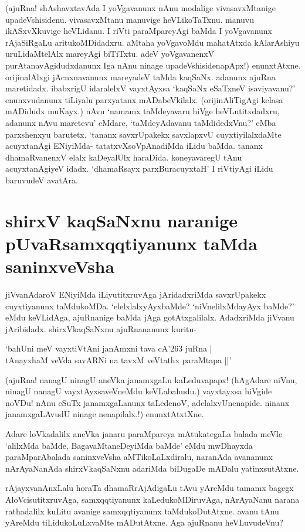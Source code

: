 (ajuRna! shAshavxtavAda I yoVgavanunx nAnu modalige vivasavxMtanige upadeVshisidenu. vivasavxMtanu manuvige heVLikoTaTxnu. manuvu ikASxvXkuvige heVLidanu. I riVti paraMpareyAgi baMda I yoVgavanunx rAjaSiRgaLu aritukoMDidadxru. aMtaha yoVgavoMdu mahatAtxda kAlarAshiyu uruLidaMtelAlx mareyAgi biTiTxtu. adeV yoVgavanenxV purAtanavAgidudxdanunx Iga nAnu ninage upadeVshisidenapApx!) enunxtAtxne. orijinalAlxgi jAcnxnavanunx mareyadeV taMda kaqSaNx. adanunx ajuRna maretidadx. ibabxrigU idaralelxV vayxtAyxsa `kaqSaNx eSaTxneV isaviyavanu?' enunxvudanunx tiLiyalu parxyatanx mADabeVkilalx. (orijinAliTigAgi kelasa mADidudx muKayx.) nAvu `namamx taMdeyavaru hiVge heVLutitxdadxru, adanunx nAvu maretevu' eMdare, `taMdeyAdavanu taMdidedxVnu?' eMba parxshenxyu barutetx. `tananx savxrUpakekx savxlapxvU cuyxtiyilalxdaMte acuyxtanAgi ENiyiMda- tatatxvXsoVpAnadiMda iLidu baMda. tananx dhamaRvanenxV elalx kaDeyalUlx haraDida. koneyavaregU tAnu acuyxtanAgiyeV idadx. `dhamaRsayx parxBuracuyxtaH'\label{90a} I riVtiyAgi iLidu baruvudeV avatAra. 

\section*{shirxV kaqSaNxnu naranige pUvaRsamxqqtiyanunx taMda saninxveVsha}

jiVvanAdaroV ENiyiMda iLiyutitxruvAga jAridadxriMda savxrUpakekx cuyxtiyanunx taMdukoMDa. `elelxlalxyAyxbaMde? `niVnelilxMdayAyx baMde?' eMdu keVLidAga, ajuRnanige baMda jAga gotAtxgalilalx. AdadxriMda jiVvanu jAribidadx. shirxVkaqSaNxnu ajuRnananunx kuritu-

\begin{shloka}
`bahUni meV vayxtiVtAni janAmxni tava cA\char'263 juRna |\label{91a}\\
tAnayxhaM veVda savARNi na tavxM veVtathx paraMtapa ||'
\end{shloka}

(ajuRna! nanagU ninagU aneVka janamxgaLu kaLeduvapapx! (hAgAdare niVnu, ninagU nanagU vayxtAyxsaveVneMdu keVLabahudu.) vayxtayxsa hiVgide noVDu! nAnu eSuTx janamxgaLanunx taLedenoV, adelalxvUnenapide. ninanx janamxgaLAvudU ninage nenapilalx.!) enunxtAtxtXne.

Adare loVkadalilx aneVka janaru paraMpareya mAtukategaLa balada meVle `alilxMda baMde, BagavaMtaneDeyiMda baMde' eMdu mwDhayxda paraMparAbalada saninxveVsha aMTikoLaLxdiralu, naranAda avananunx nArAyaNanAda shirxVkaqSaNxnu adariMda biDugaDe mADalu yatinxsutAtxne.

rAjayxvanAnxLalu horaTa dhamaRrAjAdigaLu tAvu yAreMdu tamamx bagegx AloVcisutitxruvAga, samxqqtiyanunx kaLedukoMDiruvAga, nArAyaNanu narana rathadalilx kuLitu avanige samxqqtiyanunx taMdukoDutAtxne. avanu tAnu yAreMdu tiLidukoLuLxvaMte mADutAtxne. Aga ajuRnanu heVLuvudeVnu?

